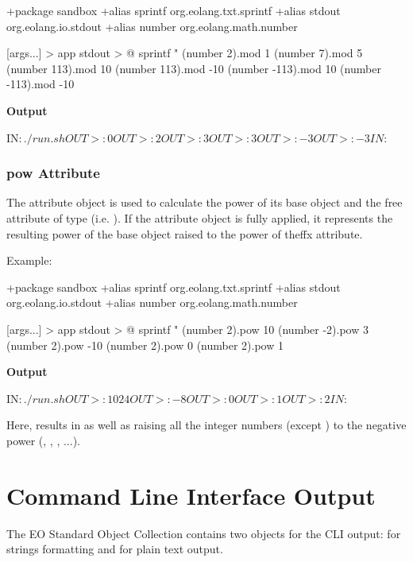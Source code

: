 \documentclass[12pt]{book}
\begin{document}
{{{\begin{ffcode}
+package sandbox
+alias sprintf org.eolang.txt.sprintf
+alias stdout org.eolang.io.stdout
+alias number org.eolang.math.number

[args...] > app
  stdout > @
    sprintf
      "%
      (number 2).mod 1
      (number 7).mod 5
      (number 113).mod 10
      (number 113).mod -10
      (number -113).mod 10
      (number -113).mod -10

\end{ffcode}
\textbf{Output}
\begin{ffcode}

IN$: ./run.sh
OUT>: 0
OUT>: 2
OUT>: 3
OUT>: 3
OUT>: -3
OUT>: -3
IN$: 
\end{ffcode}

\subsubsection{pow Attribute}
The  attribute object is used to calculate the power of its base  object and the free attribute  of type  (i.e. ).
If the  attribute object is fully applied, it represents the resulting power of the base  object raised to the power of theff{x} attribute.

Example:
\begin{ffcode}
+package sandbox
+alias sprintf org.eolang.txt.sprintf
+alias stdout org.eolang.io.stdout
+alias number org.eolang.math.number

[args...] > app
  stdout > @
    sprintf
      "%
      (number 2).pow 10
      (number -2).pow 3
      (number 2).pow -10
      (number 2).pow 0
      (number 2).pow 1
\end{ffcode}
\textbf{Output}
\begin{ffcode}
IN$: ./run.sh
OUT>: 1024
OUT>: -8
OUT>: 0
OUT>: 1
OUT>: 2
IN$: 
\end{ffcode}
Here,  results in  as well as raising all the integer numbers (except ) to the negative power (, , , ...).

\section{Command Line Interface Output}
The EO Standard Object Collection contains two objects for the CLI output:  for strings formatting and  for plain text output.

}}}
\end{document}
